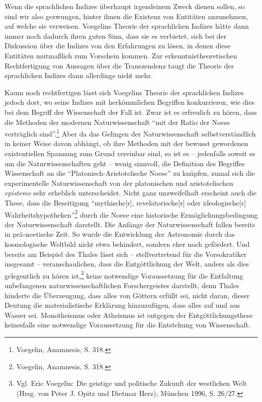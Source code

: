 Wenn die sprachlichen Indizes überhaupt irgendeinem Zweck dienen sollen,
so sind wir also gezwungen, hinter ihnen die Existenz von Entitäten
anzunehmen, auf welche sie verweisen. Voegelins Theorie der sprachlichen
Indizes hätte dann immer noch dadurch ihren guten Sinn, dass sie es verbietet,
sich bei der Diskussion über die Indizes von den Erfahrungen zu lösen, in
denen diese Entitäten mutmaßlich zum Vorschein kommen. Zur
erkenntnistheoretischen Rechtfertigung von Aussagen über die Transzendenz taugt
die Theorie der sprachlichen Indizes dann allerdings nicht mehr.

Kaum noch rechtfertigen lässt sich Voegelins Theorie der sprachlichen Indizes
jedoch dort, wo seine Indizes mit herkömmlichen Begriffen konkurrieren, wie
dies bei dem Begriff der Wissenschaft der Fall ist. Zwar ist es erfreulich zu
hören, dass die Methoden der modernen Naturwissenschaft "`mit der Ratio der
Noese verträglich sind"'.\footnote{Voegelin, Anamnesis, S. 318.} Aber da das
Gelingen der Naturwissenschaft selbstverständlich in keiner Weise davon
abhängt, ob ihre Methoden mit der bewusst gewordenen existentiellen Spannung
zum Grund vereinbar sind, so ist es -- jedenfalls soweit es um die
Naturwissenschaften geht -- wenig sinnvoll, die Definition des Begriffes
Wissenschaft an die "`Platonisch-Aristotelische Noese"' zu knüpfen, zumal sich
die experimentelle Naturwissenschaft von der platonischen und aristotelischen
{\it episteme} sehr erheblich unterscheidet. Nicht ganz unzweifelhaft
erscheint auch die These, dass die Beseitigung "`mythische[r],
revelatorische[r] oder ideologische[r]
Wahrheitshypotheken"'\footnote{Voegelin, Anamnesis, S. 318.}  durch die Noese
eine historische Ermöglichungsbedingung der Naturwissenschaft darstellt. Die
Anfänge der Naturwissenschaft fallen bereits in prä-noetische Zeit. So wurde
die Entwicklung der Astronomie durch das kosmologische Weltbild nicht etwa
behindert, sondern eher noch gefördert. Und bereits am Beispiel des Thales
lässt sich -- stellvertretend für die Vorsokratiker insgesamt --
veranschaulichen, dass die Entgöttlichung der Welt, anders als dies
gelegentlich zu hören ist,\footnote{Vgl. Eric Voegelin: Die geistige und
  politische Zukunft der westlichen Welt (Hrsg. von Peter J.  Opitz und
  Dietmar Herz), München 1996, S. 26/27.} keine notwendige Voraussetzung für
die Entfaltung unbefangenen naturwissenschaftlichen Forschergeistes darstellt,
denn Thales hinderte die Überzeugung, dass alles von Göttern erfüllt sei,
nicht daran, dieser Deutung die materialistische Erklärung hinzuzufügen, dass
alles auf und aus Wasser sei. Monotheismus oder Atheismus ist entgegen der
Entgöttlichungsthese keinesfalls eine notwendige Voraussetzung für die
Entstehung von Wissenschaft.

